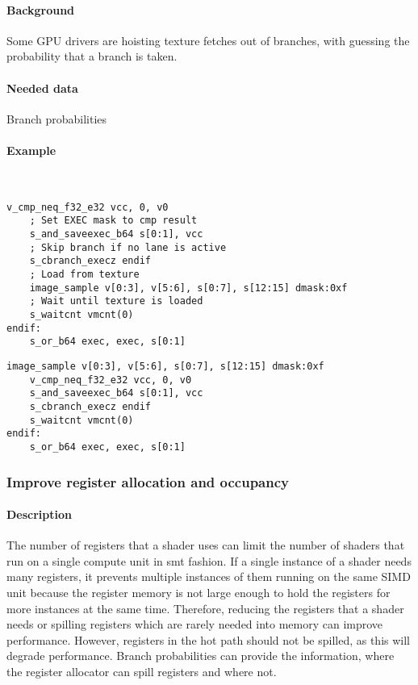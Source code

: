 \paragraph{Background} Some GPU drivers are hoisting texture fetches out of branches, with guessing the probability that a branch is taken.
\paragraph{Needed data} Branch probabilities
\paragraph{Example}\ \\
\begin{minipage}{.47\textwidth}
	\begin{lstlisting}[caption={Load Hoisting --- unoptimized},frame=tlrb,language={[amdgpu]Assembler}]
	v_cmp_neq_f32_e32 vcc, 0, v0
	; Set EXEC mask to cmp result
	s_and_saveexec_b64 s[0:1], vcc
	; Skip branch if no lane is active
	s_cbranch_execz endif
	; Load from texture
	image_sample v[0:3], v[5:6], s[0:7], s[12:15] dmask:0xf
	; Wait until texture is loaded
	s_waitcnt vmcnt(0)
endif:
	s_or_b64 exec, exec, s[0:1]
	\end{lstlisting}
\end{minipage}\hfill
\begin{minipage}{.47\textwidth}
	\begin{lstlisting}[caption={Load Hoisting --- optimized},frame=tlrb,language={[amdgpu]Assembler}]
	image_sample v[0:3], v[5:6], s[0:7], s[12:15] dmask:0xf
	v_cmp_neq_f32_e32 vcc, 0, v0
	s_and_saveexec_b64 s[0:1], vcc
	s_cbranch_execz endif
	s_waitcnt vmcnt(0)
endif:
	s_or_b64 exec, exec, s[0:1]
	\end{lstlisting}
\end{minipage}

\subsubsection{Improve register allocation and occupancy}
\paragraph{Description} The number of registers that a shader uses can limit the number of shaders that run on a single compute unit in \gls{smt} fashion.
If a single instance of a shader needs many registers, it prevents multiple instances of them running on the same SIMD unit because the register memory is not large enough to hold the registers for more instances at the same time.
Therefore, reducing the registers that a shader needs or spilling registers which are rarely needed into memory can improve performance. However, registers in the hot path should not be spilled, as this will degrade performance.
Branch probabilities can provide the information, where the register allocator can spill registers and where not.
